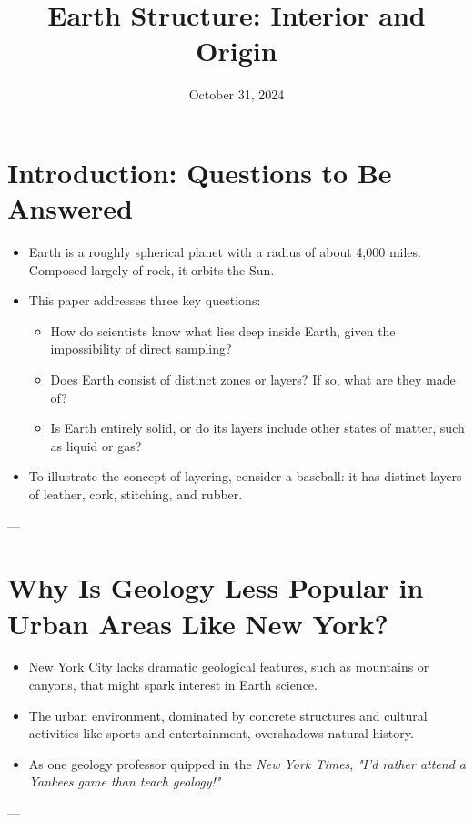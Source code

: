 \documentclass[12pt]{article}
\title{Earth Structure: Interior and Origin}
\author{}
\date{October 31, 2024}
\begin{document}
\maketitle

\section*{Introduction: Questions to Be Answered}
\begin{itemize}
    \item Earth is a roughly spherical planet with a radius of about 4,000 miles. Composed largely of rock, it orbits the Sun.
    \item This paper addresses three key questions:
    \begin{itemize}
        \item How do scientists know what lies deep inside Earth, given the impossibility of direct sampling?
        \item Does Earth consist of distinct zones or layers? If so, what are they made of?
        \item Is Earth entirely solid, or do its layers include other states of matter, such as liquid or gas?
    \end{itemize}
    \item To illustrate the concept of layering, consider a baseball: it has distinct layers of leather, cork, stitching, and rubber.
\end{itemize}

---

\section*{Why Is Geology Less Popular in Urban Areas Like New York?}
\begin{itemize}
    \item New York City lacks dramatic geological features, such as mountains or canyons, that might spark interest in Earth science.
    \item The urban environment, dominated by concrete structures and cultural activities like sports and entertainment, overshadows natural history.
    \item As one geology professor quipped in the \textit{New York Times}, \textit{"I'd rather attend a Yankees game than teach geology!"}
\end{itemize}

---
\end{document}
